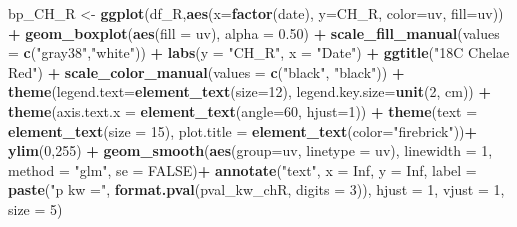 \documentclass[
]{article}
\newenvironment{Shaded}{\begin{snugshade}}{\end{snugshade}}
\newcommand{\AttributeTok}[1]{\textcolor[rgb]{0.13,0.29,0.53}{#1}}
\newcommand{\ConstantTok}[1]{\textcolor[rgb]{0.56,0.35,0.01}{#1}}
\newcommand{\DecValTok}[1]{\textcolor[rgb]{0.00,0.00,0.81}{#1}}
\newcommand{\FloatTok}[1]{\textcolor[rgb]{0.00,0.00,0.81}{#1}}
\newcommand{\FunctionTok}[1]{\textcolor[rgb]{0.13,0.29,0.53}{\textbf{#1}}}
\newcommand{\NormalTok}[1]{#1}
\newcommand{\OtherTok}[1]{\textcolor[rgb]{0.56,0.35,0.01}{#1}}
\newcommand{\SpecialCharTok}[1]{\textcolor[rgb]{0.81,0.36,0.00}{\textbf{#1}}}
\newcommand{\StringTok}[1]{\textcolor[rgb]{0.31,0.60,0.02}{#1}}
\begin{document}
\begin{Shaded}
\begin{Highlighting}[]
\NormalTok{bp\_CH\_R }\OtherTok{\textless{}{-}} \FunctionTok{ggplot}\NormalTok{(df\_R,}\FunctionTok{aes}\NormalTok{(}\AttributeTok{x=}\FunctionTok{factor}\NormalTok{(date), }\AttributeTok{y=}\NormalTok{CH\_R, }\AttributeTok{color=}\NormalTok{uv, }\AttributeTok{fill=}\NormalTok{uv)) }\SpecialCharTok{+}
  \FunctionTok{geom\_boxplot}\NormalTok{(}\FunctionTok{aes}\NormalTok{(}\AttributeTok{fill =}\NormalTok{ uv), }\AttributeTok{alpha =} \FloatTok{0.50}\NormalTok{) }\SpecialCharTok{+} 
  \FunctionTok{scale\_fill\_manual}\NormalTok{(}\AttributeTok{values =} \FunctionTok{c}\NormalTok{(}\StringTok{"gray38"}\NormalTok{,}\StringTok{"white"}\NormalTok{)) }\SpecialCharTok{+} 
  \FunctionTok{labs}\NormalTok{(}\AttributeTok{y =} \StringTok{"CH\_R"}\NormalTok{, }\AttributeTok{x =} \StringTok{"Date"}\NormalTok{) }\SpecialCharTok{+} \FunctionTok{ggtitle}\NormalTok{(}\StringTok{"18C Chelae Red"}\NormalTok{) }\SpecialCharTok{+} 
  \FunctionTok{scale\_color\_manual}\NormalTok{(}\AttributeTok{values =} \FunctionTok{c}\NormalTok{(}\StringTok{"black"}\NormalTok{, }\StringTok{"black"}\NormalTok{)) }\SpecialCharTok{+} 
  \FunctionTok{theme}\NormalTok{(}\AttributeTok{legend.text=}\FunctionTok{element\_text}\NormalTok{(}\AttributeTok{size=}\DecValTok{12}\NormalTok{), }\AttributeTok{legend.key.size=}\FunctionTok{unit}\NormalTok{(}\DecValTok{2}\NormalTok{, }\StringTok{\textquotesingle{}cm\textquotesingle{}}\NormalTok{)) }\SpecialCharTok{+}
  \FunctionTok{theme}\NormalTok{(}\AttributeTok{axis.text.x =} \FunctionTok{element\_text}\NormalTok{(}\AttributeTok{angle=}\DecValTok{60}\NormalTok{, }\AttributeTok{hjust=}\DecValTok{1}\NormalTok{)) }\SpecialCharTok{+}
  \FunctionTok{theme}\NormalTok{(}\AttributeTok{text =} \FunctionTok{element\_text}\NormalTok{(}\AttributeTok{size =} \DecValTok{15}\NormalTok{), }\AttributeTok{plot.title =} \FunctionTok{element\_text}\NormalTok{(}\AttributeTok{color=}\StringTok{"firebrick"}\NormalTok{))}\SpecialCharTok{+}
  \FunctionTok{ylim}\NormalTok{(}\DecValTok{0}\NormalTok{,}\DecValTok{255}\NormalTok{) }\SpecialCharTok{+}
  \FunctionTok{geom\_smooth}\NormalTok{(}\FunctionTok{aes}\NormalTok{(}\AttributeTok{group=}\NormalTok{uv, }\AttributeTok{linetype =}\NormalTok{ uv), }\AttributeTok{linewidth =} \DecValTok{1}\NormalTok{, }\AttributeTok{method =} \StringTok{"glm"}\NormalTok{, }\AttributeTok{se =} \ConstantTok{FALSE}\NormalTok{)}\SpecialCharTok{+}
  \FunctionTok{annotate}\NormalTok{(}\StringTok{"text"}\NormalTok{, }\AttributeTok{x =} \ConstantTok{Inf}\NormalTok{, }\AttributeTok{y =} \ConstantTok{Inf}\NormalTok{, }
           \AttributeTok{label =} \FunctionTok{paste}\NormalTok{(}\StringTok{"p kw ="}\NormalTok{, }\FunctionTok{format.pval}\NormalTok{(pval\_kw\_chR, }\AttributeTok{digits =} \DecValTok{3}\NormalTok{)),}
           \AttributeTok{hjust =} \DecValTok{1}\NormalTok{, }\AttributeTok{vjust =} \DecValTok{1}\NormalTok{, }\AttributeTok{size =} \DecValTok{5}\NormalTok{)}


\end{Highlighting}
\end{Shaded}
\end{document}
